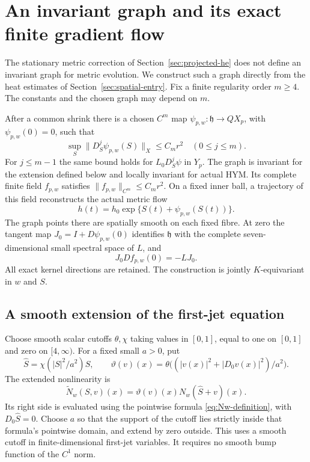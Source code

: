 \section{An invariant graph and its exact finite gradient flow}
\label{sec:invariant-dynamics}

The stationary metric correction of Section~\ref{sec:projected-he}
does not define an invariant graph for metric evolution. We
construct such a graph directly from the heat estimates of
Section~\ref{sec:spatial-entry}. Fix a finite regularity order
$m\ge4$. The constants and the chosen graph may depend on $m$.

\begin{theorem}\label{thm:invariant-graph}
After a common shrink there is a chosen $C^m$ map
$\psi_{p,w}:\mathfrak h\to QX_p$, with $\psi_{p,w}(0)=0$,
such that
\begin{equation}\label{eq:graph-derivative-bounds}
 \sup_S\|D_S^j\psi_{p,w}(S)\|_X\le C_mr^2
                          \quad(0\le j\le m).
\end{equation}
For $j\le m-1$ the same bound holds for
$L_0D_S^j\psi$ in $Y_p$. The graph is invariant for
the extension defined below and locally invariant for actual
HYM. Its complete finite field $f_{p,w}$ satisfies
$\|f_{p,w}\|_{C^m}\le C_mr^2$.
On a fixed inner ball, a trajectory of this field reconstructs
the actual metric flow
\begin{equation}\label{eq:graph-reconstruction}
             h(t)=h_0\exp\{S(t)+\psi_{p,w}(S(t))\}.
\end{equation}
The graph points there are spatially smooth on each fixed fibre.
At zero the tangent map $J_0=I+D\psi_{p,w}(0)$ identifies
$\mathfrak h$ with the complete seven-dimensional small
spectral space of $L$, and
\begin{equation}\label{eq:graph-linear-intertwining}
                         J_0Df_{p,w}(0)=-LJ_0.
\end{equation}
All exact kernel directions are retained.
The construction is jointly $K$-equivariant in $w$ and $S$.
\end{theorem}

\subsection{A smooth extension of the first-jet equation}

Choose smooth scalar cutoffs $\theta,\chi$ taking values in
$[0,1]$, equal to one on $[0,1]$ and zero on $[4,\infty)$.
For a fixed small $a>0$, put
\[
 \widehat S=\chi(|S|^2/a^2)S,\qquad
 \vartheta(v)(x)=\theta\bigl((|v(x)|^2+|D_0v(x)|^2)/a^2\bigr).
\]
The extended nonlinearity is
\begin{equation}\label{eq:jet-extension}
 \widetilde N_w(S,v)(x)=\vartheta(v)(x)
                                  N_w(\widehat S+v)(x).
\end{equation}
Its right side is evaluated using the pointwise formula
\eqref{eq:Nw-definition}, with $D_0\widehat S=0$.
Choose $a$ so that the support of the cutoff lies strictly
inside that formula's pointwise domain, and extend by zero
outside. This uses a smooth cutoff in finite-dimensional
first-jet variables. It requires no smooth bump function
of the $C^1$ norm.

